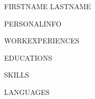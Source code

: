 \documentclass[10pt, letterpaper]{article}
\newenvironment{header}{
    \setlength{\topsep}{0pt}\par\kern\topsep\centering\linespread{1.5}
}{
    \par\kern\topsep
} %
\begin{document}
    \vspace{-5cm}
    \newcommand{\AND}{\unskip
        \cleaders\copy\ANDbox\hskip\wd\ANDbox
        \ignorespaces
    }
    \newsavebox\ANDbox
    \sbox\ANDbox{$|$}

    \begin{header}
        \fontsize{25 pt}{25 pt}\selectfont FIRSTNAME LASTNAME 

        \vspace{5 pt}
        \normalsize

        PERSONALINFO

    \end{header}

    \vspace{5 pt - 0.3 cm}

    WORKEXPERIENCES

    EDUCATIONS

    SKILLS

    LANGUAGES
\end{document}
